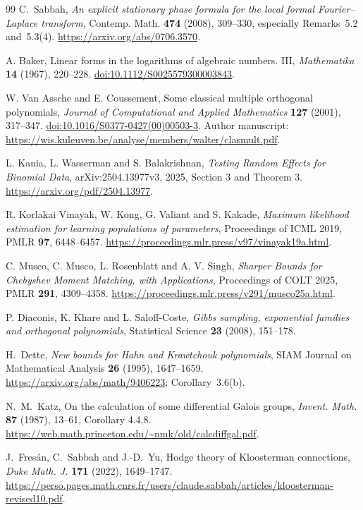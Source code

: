 \documentclass[11pt,a4paper]{article}
\theoremstyle{definition}
\theoremstyle{remark}
\numberwithin{equation}{section}
\begin{document}
\begin{thebibliography}{99}
C.~Sabbah, \emph{An explicit stationary phase formula for the local
formal Fourier--Laplace transform}, Contemp. Math. \textbf{474}
(2008), 309--330, especially Remarks~5.2 and~5.3(4).
\url{https://arxiv.org/abs/0706.3570}.

A. Baker, Linear forms in the logarithms of algebraic numbers. III,
\emph{Mathematika} \textbf{14} (1967), 220--228.
\href{https://doi.org/10.1112/S0025579300003843}{doi:10.1112/S0025579300003843}.

W. Van Assche and E. Coussement, Some classical multiple orthogonal
polynomials, \emph{Journal of Computational and Applied Mathematics}
\textbf{127} (2001), 317--347.
\href{https://doi.org/10.1016/S0377-0427(00)00503-3}{doi:10.1016/S0377-0427(00)00503-3}.
Author manuscript: \url{https://wis.kuleuven.be/analyse/members/walter/clasmult.pdf}.

L. Kania, L. Wasserman and S. Balakrishnan,
\emph{Testing Random Effects for Binomial Data}, arXiv:2504.13977v3,
2025, Section 3 and Theorem 3.
\url{https://arxiv.org/pdf/2504.13977}.

R. Korlakai Vinayak, W. Kong, G. Valiant and S. Kakade,
\emph{Maximum likelihood estimation for learning populations of parameters},
Proceedings of ICML 2019, PMLR \textbf{97}, 6448--6457.
\url{https://proceedings.mlr.press/v97/vinayak19a.html}.

C. Musco, C. Musco, L. Rosenblatt and A. V. Singh,
\emph{Sharper Bounds for Chebyshev Moment Matching, with Applications},
Proceedings of COLT 2025, PMLR \textbf{291}, 4309--4358.
\url{https://proceedings.mlr.press/v291/musco25a.html}.

P. Diaconis, K. Khare and L. Saloff-Coste,
\emph{Gibbs sampling, exponential families and orthogonal polynomials},
Statistical Science \textbf{23} (2008), 151--178.

H.~Dette, \emph{New bounds for Hahn and Krawtchouk polynomials},
SIAM Journal on Mathematical Analysis \textbf{26} (1995), 1647--1659.
\url{https://arxiv.org/abs/math/9406223}; Corollary~3.6(b).

N.~M.~Katz, On the calculation of some differential Galois groups,
\emph{Invent. Math.} \textbf{87} (1987), 13--61, Corollary 4.4.8.
\url{https://web.math.princeton.edu/~nmk/old/calcdiffgal.pdf}.

J.~Fres\'an, C.~Sabbah and J.-D.~Yu, Hodge theory of Kloosterman
connections, \emph{Duke Math. J.} \textbf{171} (2022), 1649--1747.
\url{https://perso.pages.math.cnrs.fr/users/claude.sabbah/articles/kloosterman-revised10.pdf}.


\end{thebibliography}
\end{document}
